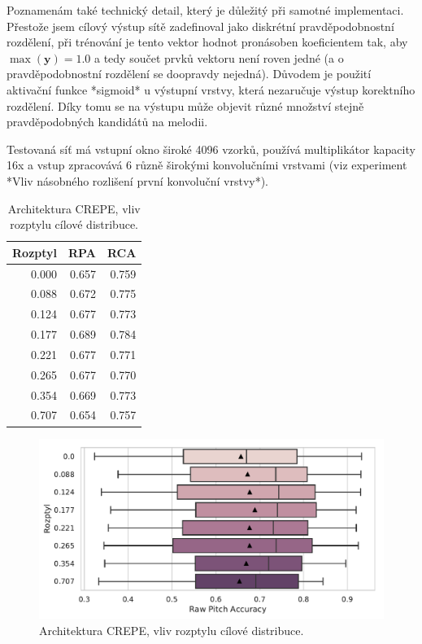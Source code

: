 Poznamenám také technický detail, který je důležitý při samotné implementaci. Přestože jsem cílový výstup sítě zadefinoval jako diskrétní pravděpodobnostní rozdělení, při trénování je tento vektor hodnot pronásoben koeficientem tak, aby $\max(\mathbf{y}) = 1.0$ a tedy součet prvků vektoru není roven jedné (a o pravděpodobnostní rozdělení se doopravdy nejedná). Důvodem je použití aktivační funkce *sigmoid* u výstupní vrstvy, která nezaručuje výstup korektního rozdělení. Díky tomu se na výstupu může objevit různé množství stejně pravděpodobných kandidátů na melodii.

Testovaná síť má vstupní okno široké 4096 vzorků, používá multiplikátor kapacity 16x a vstup zpracovává 6 různě širokými konvolučními vrstvami (viz experiment *Vliv násobného rozlišení první konvoluční vrstvy*).


\begin{table}[h!]
\centering
    \begin{tabular}{rrr}
    \toprule
    Rozptyl &   RPA &   RCA \\
    \midrule
    0.000 & 0.657 & 0.759 \\
    0.088 & 0.672 & 0.775 \\
    0.124 & 0.677 & 0.773 \\
    0.177 & 0.689 & 0.784 \\
    0.221 & 0.677 & 0.771 \\
    0.265 & 0.677 & 0.770 \\
    0.354 & 0.669 & 0.773 \\
    0.707 & 0.654 & 0.757 \\
    \bottomrule
    \end{tabular}

\caption{Architektura CREPE, vliv rozptylu cílové distribuce.}\label{tab:crepe_diskretizace}
\end{table}

\begin{figure}[h]\centering
    \includegraphics[scale=0.6]{../img/figures/crepe_rozptyl.pdf}
\caption{Architektura CREPE, vliv rozptylu cílové distribuce.}\label{obr:crepe_diskretizace}
\end{figure}



